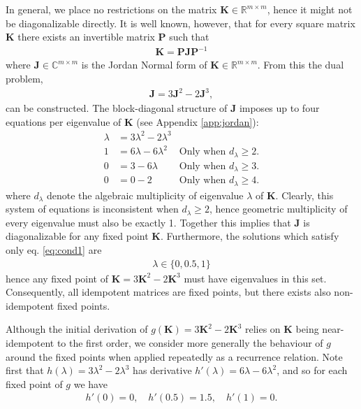 \documentclass{article}
\theoremstyle{plain}
\theoremstyle{definition}
\theoremstyle{remark}
\newcommand{\vJ}{\mathbf{J}}
\newcommand{\vK}{\mathbf{K}}
\newcommand{\vP}{\mathbf{P}}
\begin{document}
In general, we place no restrictions on the matrix $\vK \in \mathbb{R}^{m \times m}$, hence it might not be diagonalizable directly. It is well known, however, that for every square matrix $\vK$ there exists an invertible matrix $\vP$ such that
\begin{align*}
    \vK = \vP \vJ \vP^{-1}
\end{align*}
where $\vJ \in \mathbb{C}^{m \times m}$ is the Jordan Normal form \cite{jordan-form} of $\vK \in \mathbb{R}^{m \times m}$. From this the dual problem,
\begin{align*}
    \vJ = 3 \vJ^2 - 2 \vJ^3,
\end{align*}
can be constructed. The block-diagonal structure of $\vJ$ imposes up to four equations per eigenvalue of $\vK$ (see Appendix \ref{app:jordan}):
\begin{align}
    \lambda & = 3\lambda^2 - 2\lambda^3 & \label{eq:cond1}                                   \\
    1       & = 6\lambda - 6\lambda^2   & \text{Only when $d_\lambda\geq2$.}\label{eq:cond2} \\
    0       & = 3 - 6\lambda            & \text{Only when $d_\lambda\geq3$.}\label{eq:cond3} \\
    0       & = 0 - 2                   & \text{Only when $d_\lambda\geq4$.}\label{eq:cond4}
\end{align}
where $d_\lambda$ denote the algebraic multiplicity of eigenvalue $\lambda$ of $\vK$. Clearly, this system of equations is inconsistent when $d_{\lambda} \geq 2$, hence geometric multiplicity of every eigenvalue must also be exactly 1. Together this implies that $\vJ$ is diagonalizable for any fixed point $\vK$. Furthermore, the solutions which satisfy only eq. \ref{eq:cond1} are
\begin{align*}
    \lambda \in \{0, 0.5, 1\}
\end{align*}
hence any fixed point of $\vK = 3 \vK^2 - 2 \vK^3$ must have eigenvalues in this set. Consequently, all idempotent matrices are fixed points, but there exists also non-idempotent fixed points.

Although the initial derivation of $g(\vK) = 3 \vK^2 - 2 \vK^3$ relies on $\vK$ being near-idempotent to the first order, we consider more generally the behaviour of $g$ around the fixed points when applied repeatedly as a recurrence relation. Note first that $h(\lambda) = 3\lambda^2 - 2\lambda^3$ has derivative $h'(\lambda) = 6\lambda - 6\lambda^2$, and so for each fixed point of $g$ we have
\begin{align*}
    h'(0) = 0, \quad h'(0.5) = 1.5, \quad h'(1) = 0.
\end{align*}
\end{document}
